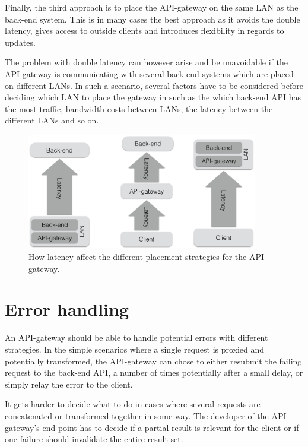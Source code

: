 \documentclass{cslthse-msc}
\begin{document}
Finally, the third approach is to place the API-gateway on the same LAN as the back-end system. This is in many cases the best approach as it avoids the double latency, gives access to outside clients and introduces flexibility in regards to updates. 

The problem with double latency can however arise and be unavoidable if the API-gateway is communicating with several back-end systems which are placed on different LANs. In such a scenario, several factors have to be considered before deciding which LAN to place the gateway in such as the which back-end API has the most traffic, bandwidth costs between LANs, the latency between the different LANs and so on.

\begin{figure}[H]
  \centering
    \begin{center}
      \includegraphics[width=0.9\textwidth]{images/api_gateway_latency.png}
    \end{center}
  \caption{How latency affect the different placement strategies for the API-gateway.}
\end{figure}

\section{Error handling}
An API-gateway should be able to handle potential errors with different strategies. In the simple scenarios where a single request is proxied and potentially transformed, the API-gateway can chose to either resubmit the failing request to the back-end API, a number of times potentially after a small delay, or simply relay the error to the client.

It gets harder to decide what to do in cases where several requests are concatenated or transformed together in some way. The developer of the API-gateway's end-point has to decide if a partial result is relevant for the client or if one failure should invalidate the entire result set.
\end{document}
